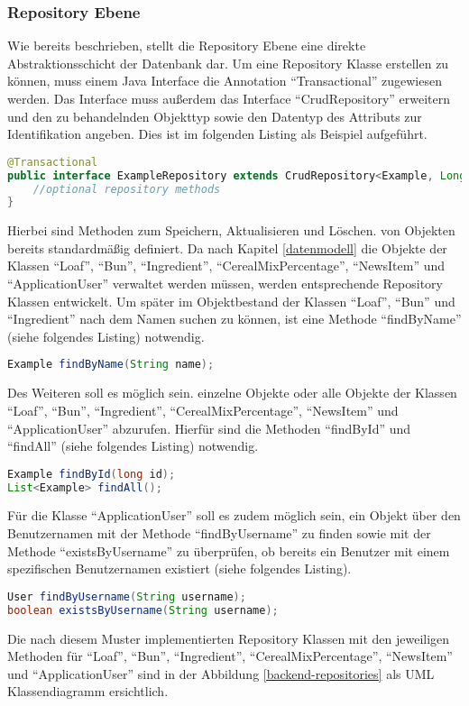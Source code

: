 \subsubsection{Repository Ebene}
Wie bereits beschrieben, stellt die Repository Ebene eine direkte Abstraktionsschicht der Datenbank dar.
Um eine Repository Klasse erstellen zu können, muss einem Java Interface die Annotation \enquote{Transactional} zugewiesen werden. Das Interface muss außerdem das Interface \enquote {CrudRepository} erweitern und den zu behandelnden Objekttyp sowie den Datentyp des Attributs zur Identifikation angeben. Dies ist im folgenden Listing als Beispiel aufgeführt.
\begin{lstlisting}[language=Java]
@Transactional
public interface ExampleRepository extends CrudRepository<Example, Long> {
	//optional repository methods
}
\end{lstlisting}

Hierbei sind Methoden zum Speichern, Aktualisieren und Löschen. von Objekten bereits standardmäßig definiert.
Da nach Kapitel \ref{datenmodell} die Objekte der Klassen \enquote{Loaf}, \enquote{Bun}, \enquote{Ingredient}, \enquote{CerealMixPercentage}, \enquote{NewsItem} und \enquote{ApplicationUser} verwaltet werden müssen, werden entsprechende Repository Klassen entwickelt.
Um später im Objektbestand der Klassen \enquote{Loaf}, \enquote{Bun} und \enquote{Ingredient} nach dem Namen suchen zu können, ist eine Methode \enquote{findByName} (siehe folgendes Listing) notwendig.
\begin{lstlisting}[language=Java]
Example findByName(String name);
\end{lstlisting}

Des Weiteren soll es möglich sein. einzelne Objekte oder alle Objekte der Klassen \enquote{Loaf}, \enquote{Bun}, \enquote{Ingredient}, \enquote{CerealMixPercentage}, \enquote{NewsItem} und \enquote{ApplicationUser} abzurufen.
Hierfür sind die Methoden \enquote{findById} und \enquote{findAll} (siehe folgendes Listing) notwendig.
\begin{lstlisting}[language=Java]
Example findById(long id);
List<Example> findAll();
\end{lstlisting}

\clearpage

Für die Klasse \enquote{ApplicationUser} soll es zudem möglich sein, ein Objekt über den Benutzernamen mit der Methode \enquote{findByUsername} zu finden sowie mit der Methode \enquote{existsByUsername} zu überprüfen, ob bereits ein Benutzer mit einem spezifischen Benutzernamen existiert (siehe folgendes Listing).
\begin{lstlisting}[language=Java]
User findByUsername(String username);
boolean existsByUsername(String username);
\end{lstlisting}
Die nach diesem Muster implementierten Repository Klassen mit den jeweiligen Methoden für \enquote{Loaf}, \enquote{Bun}, \enquote{Ingredient}, \enquote{CerealMixPercentage}, \enquote{NewsItem} und \enquote{ApplicationUser} sind in der Abbildung \ref{backend-repositories} als UML Klassendiagramm ersichtlich.

